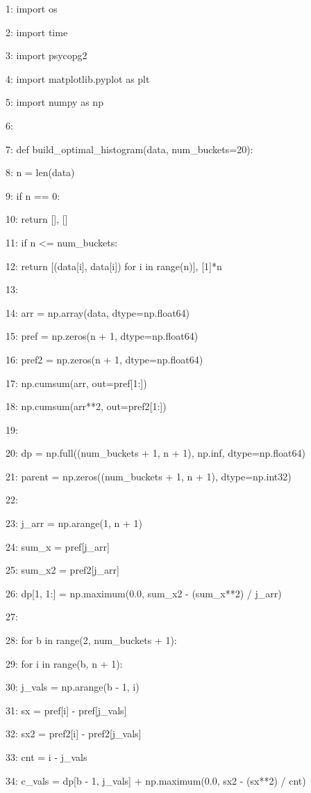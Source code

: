 \documentclass[11pt,a4paper]{article}
\begin{document}
1: import os

2: import time

3: import psycopg2

4: import matplotlib.pyplot as plt

5: import numpy as np

6:

7: def build\_optimal\_histogram(data, num\_buckets=20):

8:     n = len(data)

9:     if n == 0:

10:         return [], []

11:     if n <= num\_buckets:

12:         return [(data[i], data[i]) for i in range(n)], [1]*n

13:

14:     arr = np.array(data, dtype=np.float64)

15:     pref = np.zeros(n + 1, dtype=np.float64)

16:     pref2 = np.zeros(n + 1, dtype=np.float64)

17:     np.cumsum(arr, out=pref[1:])

18:     np.cumsum(arr**2, out=pref2[1:])

19:

20:     dp = np.full((num\_buckets + 1, n + 1), np.inf, dtype=np.float64)

21:     parent = np.zeros((num\_buckets + 1, n + 1), dtype=np.int32)

22:

23:     j\_arr = np.arange(1, n + 1)

24:     sum\_x = pref[j\_arr]

25:     sum\_x2 = pref2[j\_arr]

26:     dp[1, 1:] = np.maximum(0.0, sum\_x2 - (sum\_x**2) / j\_arr)

27:

28:     for b in range(2, num\_buckets + 1):

29:         for i in range(b, n + 1):

30:             j\_vals = np.arange(b - 1, i)

31:             sx = pref[i] - pref[j\_vals]

32:             sx2 = pref2[i] - pref2[j\_vals]

33:             cnt = i - j\_vals

34:             c\_vals = dp[b - 1, j\_vals] + np.maximum(0.0, sx2 - (sx**2) / cnt)
\end{document}
